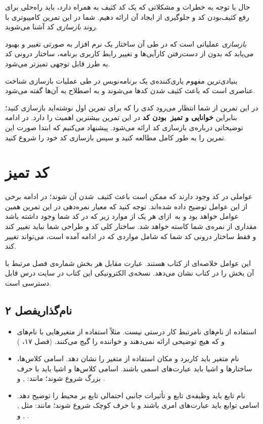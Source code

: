 \documentclass{utap}
\newcommand{\chap}[1]{\hfill\normalfont\normalsize فصل #1}
\begin{document}
حال با توجه به خطرات و مشکلاتی که یک کد کثیف به همراه دارد، باید راه‌حلی برای رفع کثیف‌بودن کد و جلو‌‌گیری از ایجاد آن ارائه دهیم. شما در این تمرین کامپیوتری با روند \textit{بازسازی} کد آشنا می‌شوید.

\textit{بازسازی} عملیاتی است که در طی آن ساختار یک نرم افزار به صورتی تغییر و بهبود می‌یابد که بدون از دست‌رفتن کارآیی‌ها و تغییر رابط کاربری برنامه، ساختار درونی کد به طرز قابل توجهی تمیزتر می‌شود.

بنیادی‌ترین مفهوم یاری‌کننده‌ی یک برنامه‌نویس در طی عملیات بازسازی شناخت عناصری است که باعث کثیف شدن کدها می‌شوند و به اصطلاح به آن‌ها  گفته می‌شود.

در این تمرین از شما انتظار می‌رود کدی را که برای تمرین اول نوشته‌اید بازسازی کنید؛ بنابراین \textbf{خوانایی و تمیز~بودن کد} در این تمرین بیشترین اهمیت را دارد. در ادامه توضیحاتی درباره‌ی بازسازی کد ارائه می‌شود. پیشنهاد می‌کنیم که ابتدا صورت این تمرین را به طور کامل مطالعه کنید و سپس بازسازی کد خود را شروع کنید.

\section{کد تمیز}
عواملی در کد وجود دارند که ممکن است باعث کثیف~شدن آن شوند؛ در ادامه برخی از این عوامل توضیح داده شده‌اند. توجه کنید که معیار نمره‌دهی در این تمرین همین عوامل خواهد بود و به~ازای هر یک از موارد زیر که در کد شما وجود داشته باشد مقداری از نمره‌ی شما کاسته خواهد شد. ساختار کلی کد و طراحی شما نباید تغییر کند و فقط ساختار درونی کد شما که شامل مواردی که در ادامه آمده است، می‌تواند تغییر کند.

این عوامل خلاصه‌ای از کتاب  هستند. عبارت مقابل هر بخش شماره‌ی فصل مرتبط با آن بخش را در کتاب نشان می‌دهد.
نسخه‌ی الکترونیکی این کتاب در سایت درس قابل دسترسی است.

\subsection[نام‌گذاری]{نام‌گذاری\chap{۲}}
\begin{itemize}
    \item
استفاده از نام‌های نامرتبط کار درستی نیست. مثلاً استفاده از متغیر‌هایی با نام‌های  و  که هیچ توضیحی ارائه نمی‌دهند و خواننده را گیج می‌کنند. (فصل ۱۷، )
    \item
نام متغیر باید کاربرد و مکان استفاده از متغیر را نشان دهد.
اسامی کلاس‌ها، ساختارها و اشیا باید عبارت‌های اسمی باشند. اسامی کلاس‌ها و اشیا باید با حرف بزرگ شروع شوند؛ مانند: ,  و .
    \item
نام تابع باید وظیفه‌ی تابع و تأثیرات جانبی احتمالی تابع بر محیط را توضیح دهد.
اسامی توابع باید عبارت‌های امری باشند و با حرف کوچک شروع شوند؛ مانند: مثل , ,  و .
\end{itemize}
\end{document}
